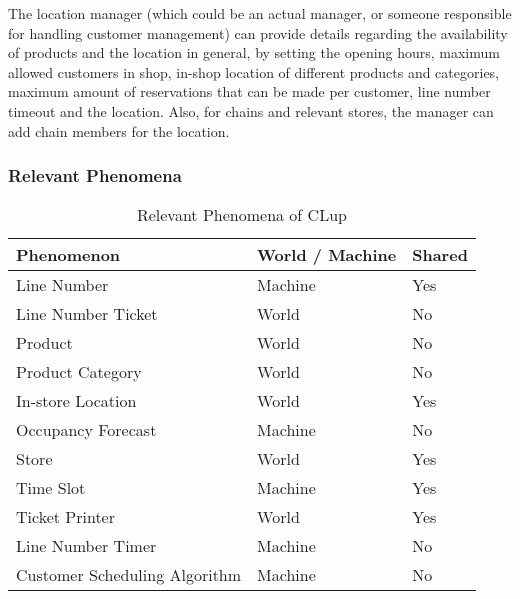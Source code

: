The location manager (which could be an actual manager, or someone responsible for handling customer management) can provide details regarding the availability of products and the location in general, by setting the opening hours, maximum allowed customers in shop, in-shop location of different products and categories, maximum amount of reservations that can be made per customer, line number timeout and the location.
Also, for chains and relevant stores, the manager can add chain members for the location.

\subsubsection{Relevant Phenomena}

\begin{table}[H]
    \begin{tabular}{|p{4cm}|p{4cm}|p{4cm}|}
        \hline
        \textbf{Phenomenon}    & \textbf{World / Machine}       & \textbf{Shared } \\ \hline
        Line Number & Machine & Yes \\ \hline
        Line Number Ticket & World & No \\ \hline
        Product & World & No \\ \hline
        Product Category & World & No \\ \hline
        In-store Location & World & Yes \\ \hline
        Occupancy Forecast & Machine & No \\ \hline
        Store & World & Yes \\ \hline
        Time Slot & Machine & Yes \\ \hline
        Ticket Printer & World & Yes \\ \hline
        Line Number Timer & Machine & No \\ \hline
        Customer Scheduling Algorithm & Machine & No \\ \hline
    \end{tabular}
    \caption{Relevant Phenomena of CLup}
\end{table}





